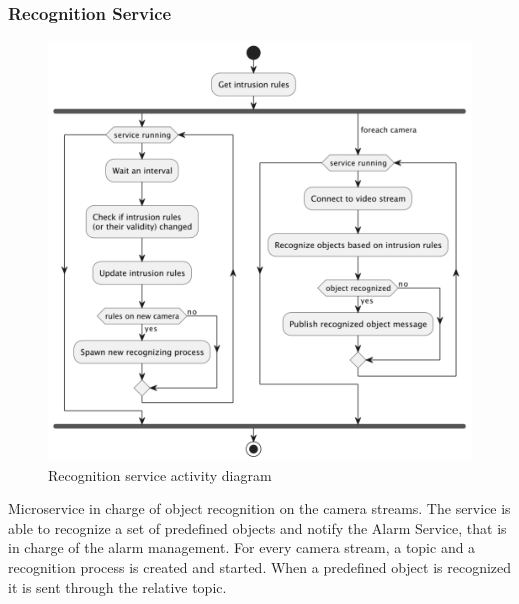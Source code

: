 \documentclass{scrartcl}
\begin{document}
    \subsubsection{Recognition Service}
    \begin{figure}
        \centering
        \includegraphics[scale=0.6]{img/recognition-activity}
        \caption{Recognition service activity diagram}
        \label{fig:recognition-activity}
    \end{figure}
    Microservice in charge of object recognition on the camera streams.
    The service is able to recognize a set of predefined objects and notify the Alarm Service, that is in charge of the alarm management.
    For every camera stream, a topic and a recognition process is created and started.
    When a predefined object is recognized it is sent through the relative topic.
\end{document}
